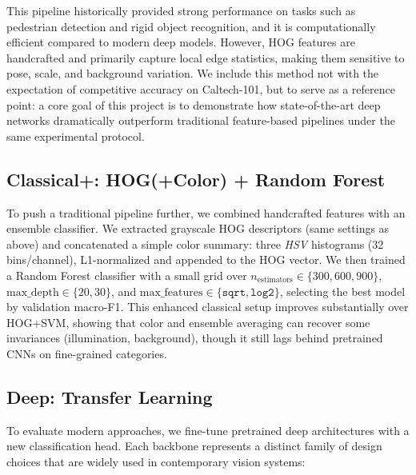 \documentclass[11pt]{article}
\begin{document}
This pipeline historically provided strong performance on tasks such as pedestrian detection and rigid object recognition, and it is computationally efficient compared to modern deep models. 
However, HOG features are handcrafted and primarily capture local edge statistics, making them sensitive to pose, scale, and background variation. 
We include this method not with the expectation of competitive accuracy on Caltech-101, but to serve as a reference point: a core goal of this project is to demonstrate how state-of-the-art deep networks dramatically outperform traditional feature-based pipelines under the same experimental protocol. 

\subsection{Classical+: HOG(+Color) + Random Forest}
To push a traditional pipeline further, we combined handcrafted features with an ensemble classifier.
We extracted grayscale HOG descriptors (same settings as above) and concatenated a simple color
summary: three \emph{HSV} histograms (32 bins/channel), L1-normalized and appended to the HOG vector.
We then trained a Random Forest classifier \cite{Breiman2001} with a small grid over
$n_{\text{estimators}}\in\{300,600,900\}$, $\text{max\_depth}\in\{20,30\}$, and
$\text{max\_features}\in\{\texttt{sqrt},\texttt{log2}\}$, selecting the best model by validation macro-F1.
This enhanced classical setup improves substantially over HOG+SVM, showing that color and ensemble averaging
can recover some invariances (illumination, background), though it still lags behind pretrained CNNs on
fine-grained categories.


\subsection{Deep: Transfer Learning}
To evaluate modern approaches, we fine-tune pretrained deep architectures with a new classification head. 
Each backbone represents a distinct family of design choices that are widely used in contemporary vision systems:
\end{document}
